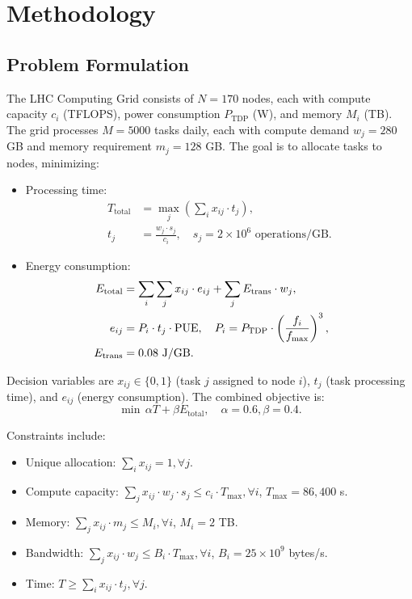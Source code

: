 \documentclass[a4paper,11pt]{article}
\begin{document}
\section{Methodology}

\subsection{Problem Formulation}
The LHC Computing Grid consists of $N=170$ nodes, each with compute capacity $c_i$ (TFLOPS), power consumption $P_{\text{TDP}}$ (W), and memory $M_i$ (TB). The grid processes $M=5000$ tasks daily, each with compute demand $w_j=280$ GB and memory requirement $m_j=128$ GB. The goal is to allocate tasks to nodes, minimizing:
\begin{itemize}\raggedright
    \item Processing time:
    \begin{align*}
        T_{\text{total}} &= \max_j \left( \sum_i x_{ij} \cdot t_j \right), \\
        t_j &= \frac{w_j \cdot s_j}{c_i}, \quad s_j = 2 \times 10^6 \text{ operations/GB}.
    \end{align*}
    \item Energy consumption:
    \begin{align*}
        \hspace*{-0.5cm}E_{\text{total}} &= \sum_i \sum_j x_{ij} \cdot e_{ij} + \sum_j E_{\text{trans}} \cdot w_j, \\
        \hspace*{-0.5cm}e_{ij} &= P_i \cdot t_j \cdot \text{PUE}, \quad P_i = P_{\text{TDP}} \cdot \left( \frac{f_i}{f_{\text{max}}} \right)^3, \\
        \hspace*{-0.5cm}E_{\text{trans}} &= 0.08 \text{ J/GB}.
    \end{align*}
\end{itemize}

Decision variables are $x_{ij} \in \{0, 1\}$ (task $j$ assigned to node $i$), $t_j$ (task processing time), and $e_{ij}$ (energy consumption). The combined objective is:
\begin{equation}
\min \, \alpha T + \beta E_{\text{total}}, \quad \alpha = 0.6, \beta = 0.4.
\end{equation}

Constraints include:
\begin{itemize}
    \item Unique allocation: $\sum_i x_{ij} = 1, \forall j$.
    \item Compute capacity: $\sum_j x_{ij} \cdot w_j \cdot s_j \leq c_i \cdot T_{\text{max}}, \forall i$, $T_{\text{max}} = 86,400$ s.
    \item Memory: $\sum_j x_{ij} \cdot m_j \leq M_i, \forall i$, $M_i = 2$ TB.
    \item Bandwidth: $\sum_j x_{ij} \cdot w_j \leq B_i \cdot T_{\text{max}}, \forall i$, $B_i = 25 \times 10^9$ bytes/s.
    \item Time: $T \geq \sum_i x_{ij} \cdot t_j, \forall j$.
\end{itemize}
\end{document}
